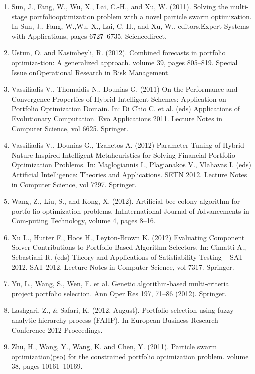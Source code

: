 \documentclass[12pt]{article}
\begin{document}
\begin{enumerate}
      \item Sun, J., Fang, W., Wu, X., Lai, C.-H., and Xu, W. (2011). Solving the multi-stage portfoliooptimization problem with a novel particle swarm optimization.  In Sun, J., Fang, W.,Wu, X., Lai, C.-H., and Xu, W., editors,Expert Systems with Applications, pages 6727–6735. Sciencedirect.
      \item Ustun, O. and Kasimbeyli, R. (2012).  Combined forecasts in portfolio optimiza-tion:  A generalized approach.  volume 39, pages 805–819.  Special Issue onOperational Research in Risk Management.
      \item Vassiliadis V., Thomaidis N., Dounias G. (2011) On the Performance and Convergence Properties of Hybrid Intelligent Schemes: Application on Portfolio Optimization Domain. In: Di Chio C. et al. (eds) Applications of Evolutionary Computation. Evo Applications 2011. Lecture Notes in Computer Science, vol 6625. Springer.
      \item Vassiliadis V., Dounias G., Tzanetos A. (2012) Parameter Tuning of Hybrid Nature-Inspired Intelligent Metaheuristics for Solving Financial Portfolio Optimization Problems. In: Maglogiannis I., Plagianakos V., Vlahavas I. (eds) Artificial Intelligence: Theories and Applications. SETN 2012. Lecture Notes in Computer Science, vol 7297. Springer.
      \item Wang, Z., Liu, S., and Kong, X. (2012). Artificial bee colony algorithm for portfo-lio optimization problems. InInternational Journal of Advancements in Com-puting Technology, volume 4, pages 8–16.
      \item Xu L., Hutter F., Hoos H., Leyton-Brown K. (2012) Evaluating Component Solver Contributions to Portfolio-Based Algorithm Selectors. In: Cimatti A., Sebastiani R. (eds) Theory and Applications of Satisfiability Testing – SAT 2012. SAT 2012. Lecture Notes in Computer Science, vol 7317. Springer.
      \item Yu, L., Wang, S., Wen, F. et al. Genetic algorithm-based multi-criteria project portfolio selection. Ann Oper Res 197, 71–86 (2012). Springer.
      \item Lashgari, Z., \& Safari, K. (2012, August). Portfolio selection using fuzzy analytic hierarchy process (FAHP). In European Business Research Conference 2012 Proceedings.
      \item Zhu, H., Wang, Y., Wang, K. and Chen, Y. (2011).  Particle swarm optimization(pso) for the constrained portfolio optimization problem. volume 38, pages 10161–10169.

    \end{enumerate}
  
\end{document}
